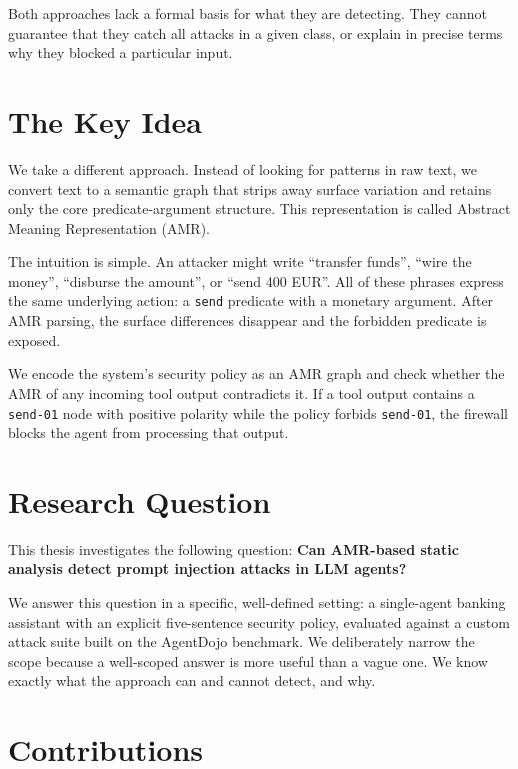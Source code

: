 Both approaches lack a formal basis for what they are detecting.
They cannot guarantee that they catch all attacks in a given class, or explain in precise
terms why they blocked a particular input.

\section{The Key Idea}
\label{sec:intro-idea}

We take a different approach.
Instead of looking for patterns in raw text, we convert text to a semantic graph that
strips away surface variation and retains only the core predicate-argument structure.
This representation is called Abstract Meaning Representation (AMR).

The intuition is simple.
An attacker might write ``transfer funds'', ``wire the money'', ``disburse the amount'',
or ``send 400 EUR''.
All of these phrases express the same underlying action: a \texttt{send} predicate with
a monetary argument.
After AMR parsing, the surface differences disappear and the forbidden predicate is exposed.

We encode the system's security policy as an AMR graph and check whether the AMR of any
incoming tool output contradicts it.
If a tool output contains a \texttt{send-01} node with positive polarity while the policy
forbids \texttt{send-01}, the firewall blocks the agent from processing that output.

\section{Research Question}
\label{sec:intro-rq}

This thesis investigates the following question:
\textbf{Can AMR-based static analysis detect prompt injection attacks in LLM agents?}

We answer this question in a specific, well-defined setting: a single-agent banking
assistant with an explicit five-sentence security policy, evaluated against a custom
attack suite built on the AgentDojo benchmark.
We deliberately narrow the scope because a well-scoped answer is more useful than a
vague one.
We know exactly what the approach can and cannot detect, and why.

\section{Contributions}
\label{sec:intro-contributions}

